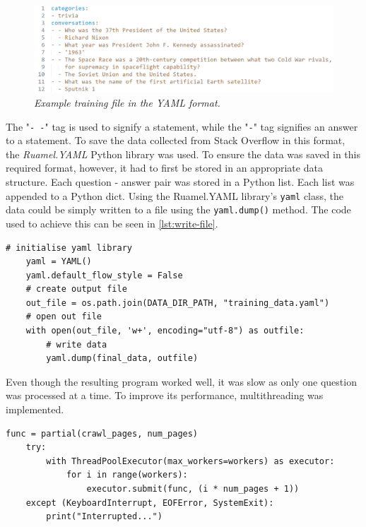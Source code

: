 \documentclass[12pt,a4paper]{article}
\newcommand{\captionstyle}[1] {
    \small{\textit{#1}}
}
\begin{document}
\begin{figure}[!htb]%
    \centering
    \includegraphics[width=1.0\columnwidth]{yaml-train}%
    \caption{\captionstyle{Example training file in the YAML format.}}%
    \label{fig:yaml-train}%
\end{figure}

The "\verb|- -|" tag is used to signify a statement, while the "\verb|-|" tag signifies an answer to a statement. To save the data collected from Stack Overflow in this format, the \textit{Ruamel.YAML} Python library was used. To ensure the data was saved in this required format, however, it had to first be stored in an appropriate data structure. Each question - answer pair was stored in a Python list. Each list was appended to a Python dict. Using the Ruamel.YAML library's \texttt{yaml} class, the data could be simply written to a file using the \texttt{yaml.dump()} method. The code used to achieve this can be seen in \cref{lst:write-file}.

\begin{lstlisting}[caption={\captionstyle{Writing scraped data to a file in the YAML format.}}, label={lst:write-file}]
    # initialise yaml library
    yaml = YAML()
    yaml.default_flow_style = False
    # create output file
    out_file = os.path.join(DATA_DIR_PATH, "training_data.yaml")
    # open out file
    with open(out_file, 'w+', encoding="utf-8") as outfile:
        # write data
        yaml.dump(final_data, outfile)    
\end{lstlisting}

Even though the resulting program worked well, it was slow as only one question was processed at a time. To improve its performance, multithreading was implemented.

\begin{lstlisting}[caption={\captionstyle{Multithreaded optimisation of the web crawler.}}, label={lst:threads}]
    func = partial(crawl_pages, num_pages)
    try:
        with ThreadPoolExecutor(max_workers=workers) as executor:
            for i in range(workers):
                executor.submit(func, (i * num_pages + 1))
    except (KeyboardInterrupt, EOFError, SystemExit):
        print("Interrupted...")
\end{lstlisting}
\end{document}
